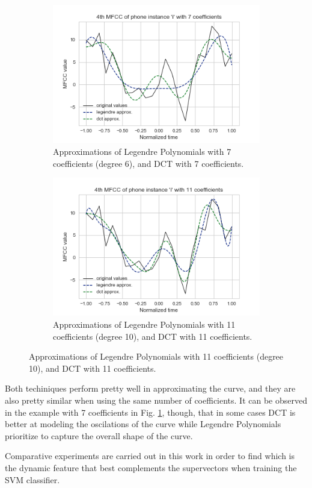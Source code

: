 \begin{figure}[H]
  \centering
  \begin{subfigure}{.5\textwidth}
    \centering
    \captionsetup{width=.95\linewidth}
    \includegraphics[width=.95\linewidth]{files/figures/method/dynamic_features_7}
    \caption{Approximations of Legendre Polynomials with 7 coefficients (degree 6),
    and DCT with 7 coefficients.}
    \label{fig:dynamic_features_7}
  \end{subfigure}%
  \begin{subfigure}{.5\textwidth}
    \centering
    \captionsetup{width=.95\linewidth}
    \includegraphics[width=.95\linewidth]{files/figures/method/dynamic_features_11}
    \caption{Approximations of Legendre Polynomials with 11 coefficients (degree 10),
    and DCT with 11 coefficients.}
    \label{fig:dynamic_features_11}
  \end{subfigure}
\end{figure}

Both techiniques perform pretty well in approximating the curve, and they are also
pretty similar when using the same number of coefficients. It can be observed
in the example with 7 coefficients in Fig. \ref{fig:dynamic_features_7}, though, that
in some cases DCT
is better at modeling the oscilations of the curve while Legendre Polynomials
prioritize to capture the overall shape of the curve.

Comparative experiments are carried
out in this work
in order to find which is the dynamic feature that best complements the supervectors when
training the SVM classifier.


